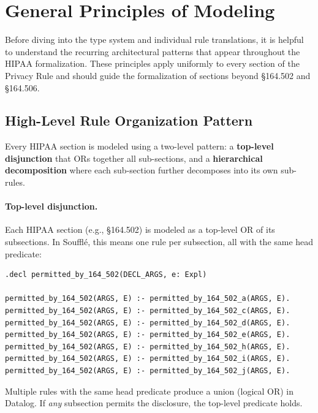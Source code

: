 \documentclass[11pt,letterpaper]{article}
\begin{document}
\section{General Principles of Modeling}
\label{sec:modeling-principles}

Before diving into the type system and individual rule translations, it is helpful to understand the recurring architectural patterns that appear throughout the HIPAA formalization. These principles apply uniformly to every section of the Privacy Rule and should guide the formalization of sections beyond \S 164.502 and \S 164.506.

\subsection{High-Level Rule Organization Pattern}
\label{sec:rule-organization}

Every HIPAA section is modeled using a two-level pattern: a \textbf{top-level disjunction} that ORs together all sub-sections, and a \textbf{hierarchical decomposition} where each sub-section further decomposes into its own sub-rules.

\paragraph{Top-level disjunction.} Each HIPAA section (e.g., \S 164.502) is modeled as a top-level OR of its subsections. In Souffl\'{e}, this means one rule per subsection, all with the same head predicate:

\begin{lstlisting}[style=soufflestyle,caption={Top-level disjunction for \S 164.502 (from hipaa\_164\_502.dl)}]
.decl permitted_by_164_502(DECL_ARGS, e: Expl)

permitted_by_164_502(ARGS, E) :- permitted_by_164_502_a(ARGS, E).
permitted_by_164_502(ARGS, E) :- permitted_by_164_502_c(ARGS, E).
permitted_by_164_502(ARGS, E) :- permitted_by_164_502_d(ARGS, E).
permitted_by_164_502(ARGS, E) :- permitted_by_164_502_e(ARGS, E).
permitted_by_164_502(ARGS, E) :- permitted_by_164_502_h(ARGS, E).
permitted_by_164_502(ARGS, E) :- permitted_by_164_502_i(ARGS, E).
permitted_by_164_502(ARGS, E) :- permitted_by_164_502_j(ARGS, E).
\end{lstlisting}

Multiple rules with the same head predicate produce a union (logical OR) in Datalog. If \emph{any} subsection permits the disclosure, the top-level predicate holds.
\end{document}
